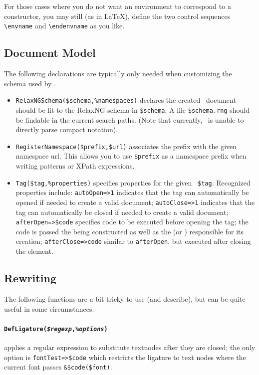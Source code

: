 \documentclass{book}
\newcommand{\ltxcode}{\lstinline[style=inlinelatexml]}
\begin{document}
For those cases where you do not want an environment to correspond
to a constructor, you may still (as in \LaTeX), define the
two control sequences \verb|\envname| and \verb|\endenvname|
as you like.

\subsection{Document Model}\label{customization.latexml.schema}
The following declarations are typically only needed when customizing
the schema used by \LaTeXML.
\begin{itemize}
\item \ltxcode|RelaxNGSchema($schema,%
 \XML\ document should be fit to the RelaxNG schema in \ltxcode|$schema|;
 A file \ltxcode|$schema.rng| should be findable in the current search paths.
(Note that currently, \LaTeXML\ is unable to directly parse compact notation).
\item \ltxcode|RegisterNamespace($prefix,$url)| associates the
 prefix with the given namespace url.  This allows you to use \ltxcode|$prefix|
 as a namespace prefix when writing  patterns or XPath expressions.
\item \ltxcode|Tag($tag,%
Recognized properties include:
\ltxcode|autoOpen=>1| indicates that the tag
can automatically be opened if needed to create a valid document;
\ltxcode|autoClose=>1| indicates that the tag can automatically be closed if needed to create
a valid document;
\ltxcode|afterOpen=>$code| specifies code to be executed before opening the tag;
the code is passed the  being constructed as well as the
 (or ) responsible for its creation;
\ltxcode|afterClose=>code| similar to \texttt{afterOpen}, but executed after closing
the element.
\end{itemize}

\subsection{Rewriting}\label{customization.latexml.rewriting}
The following functions are a bit tricky to use (and describe),
but can be quite useful in some circumstances.

\paragraph[DefLigature]{%
    \texttt{DefLigature(\textit{\$regexp},\textit{\%options})}}
applies a regular expression
to substitute textnodes after they are closed; the only option is \ltxcode|fontTest=>$code|
which restricts the ligature to text nodes where the current font passes \ltxcode|&$code($font)|.
\end{document}
